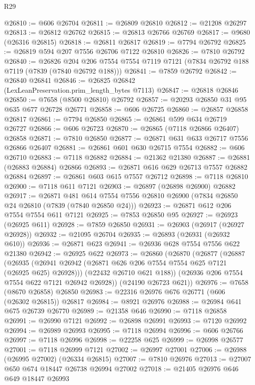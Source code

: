 \begin{lexlean}{R29}
\begin{coremodule}
@26810 := @606 @26704
@26811 := @26809 @26810
@26812 := @21208 @26297
@26813 := @26812 @26762
@26815 := @26813 @26766 @26769
@26817 := @9680 (@26316 @26815)
@26818 := @26811 @26817
@26819 := @7794 @26792
@26825 := @26819 @594 @207 @7556 @26706 @7122 @26810
@26826 := @7810 @26792
@26840 := @26826
    @204
    @206
    @7554
    @7554
    @7119
    @7121
    (@7834 @26792 @188 @7119 (@7839 (@7840 @26792 @188)))
@26841 := @7859 @26792
@26842 := @26840 @26841
@26846 := @26825 @26842 (LexLeanPreservation.prim_length_bytes @7113)
@26847 := @26818 @26846
@26850 := @7658 (@8500 @26810) @26792
@26857 := @20293 @26850 @31 @95 @635 @677 @26728 @26771
@26858 := @606 @26725
@26860 := @26857 @26858 @26817
@26861 := @7794 @26850
@26865 := @26861 @599 @634 @26719 @26727
@26866 := @606 @26723
@26870 := @26865 (@7118 @26866 @26407) @26858
@26871 := @7810 @26850
@26877 := @26871 @631 @633 @26717 @7556 @26866 @26407
@26881 := @26861 @601 @630 @26715 @7554
@26882 := @606 @26710
@26883 := @7118 @26882
@26884 := @21362 @21380
@26887 := @26881 (@26883 @26884) @26866
@26893 := @26871 @616 @629 @26713 @7557 @26882 @26884
@26897 := @26861 @603 @615 @7557 @26712
@26898 := @7118 @26810
@26900 := @7118 @611 @7121
@26903 := @26897 (@26898 @26900) @26882
@26917 := @26871
    @481
    @614
    @7554
    @7556
    @26810
    @26900
    (@7834 @26850 @24 @26810 (@7839 (@7840 @26850 @24)))
@26923 := @26871 @612 @206 @7554 @7554 @611 @7121
@26925 := @7853 @26850 @95
@26927 := @26923 (@26925 @611)
@26928 := @7859 @26850
@26931 := @26903 (@26917 (@26927 @26928))
@26932 := @21095 @26704
@26935 := @26893 (@26931 (@26932 @610))
@26936 := @26871 @623
@26941 := @26936 @628 @7554 @7556 @622 @21380
@26942 := @26925 @622
@26973 := @26860
    (@26870
      (@26877
        (@26887
          (@26935 (@26941 @26942 (@26871 @626 @206 @7554 @7554 @625 @7121 (@26925 @625) @26928)))
          (@22432 @26710 @621 @188))
        (@26936 @206 @7554 @7554 @622 @7121 @26942 @26928))
      (@24190 @26723 @621))
@26976 := @7658 (@8670 @26858) @26850
@26983 := @22316 @26976 @676 @26771 (@606 (@26302 @26815)) @26817
@26984 := @8921 @26976
@26988 := @26984 @641 @675 @26739 @26770
@26989 := @21358 @646
@26990 := @7118 @26858
@26991 := @26990 @7121
@26992 := @26898 @26991
@26993 := @7120 @26992
@26994 := @26989 @26993
@26995 := @7118 @26994
@26996 := @606 @26766
@26997 := @7118 @26996
@26998 := @22258 @625
@26999 := @26998 @26577
@27001 := @7118 @26999 @7121
@27002 := @26997 @27001
@27006 := @26988 (@26995 @27002) (@26334 @26815)
@27007 := @7810 @26976
@27013 := @27007 @650 @674 @18447 @26738 @26994 @27002
@27018 := @21405 @26976 @646 @649 @18447 @26993

\end{coremodule}
\end{lexlean}
